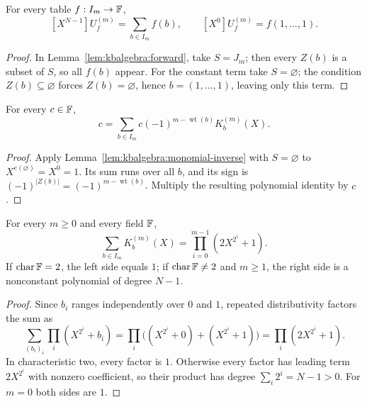 \begin{corollary}\label{cor:kbalgebra:extreme-coeffs}
For every table $f:I_m\to\mathbb{F}$,
\[
 [X^{N-1}]U_f^{(m)}=\sum_{b\in I_m}f(b),\qquad
 [X^0]U_f^{(m)}=f(1,\ldots,1).
\]
\end{corollary}
\begin{proof}
In Lemma~\ref{lem:kbalgebra:forward}, take $S=J_m$; then every $Z(b)$ is a subset of $S$, so all $f(b)$ appear. For the constant term take $S=\varnothing$; the condition $Z(b)\subseteq\varnothing$ forces $Z(b)=\varnothing$, hence $b=(1,\ldots,1)$, leaving only this term.
\end{proof}

\begin{proposition}\label{prop:kbalgebra:constant}
For every $c\in\mathbb{F}$,
\begin{equation}\label{eq:kbalgebra:constant}
 \boxed{c=\sum_{b\in I_m}c(-1)^{m-\operatorname{wt}(b)}K_b^{(m)}(X).}
\end{equation}
\end{proposition}
\begin{proof}
Apply Lemma~\ref{lem:kbalgebra:monomial-inverse} with $S=\varnothing$ to $X^{e(\varnothing)}=X^0=1$. Its sum runs over all $b$, and its sign is $(-1)^{|Z(b)|}=(-1)^{m-\operatorname{wt}(b)}$. Multiply the resulting polynomial identity by $c$.
\end{proof}

\begin{proposition}\label{prop:kbalgebra:partition}
For every $m\geq0$ and every field $\mathbb{F}$,
\begin{equation}\label{eq:kbalgebra:partition}
 \boxed{\sum_{b\in I_m}K_b^{(m)}(X)=\prod_{i=0}^{m-1}(2X^{2^i}+1).}
\end{equation}
If $\operatorname{char}\mathbb{F}=2$, the left side equals $1$; if $\operatorname{char}\mathbb{F}\neq2$ and $m\geq1$, the right side is a nonconstant polynomial of degree $N-1$.
\end{proposition}
\begin{proof}
Since $b_i$ ranges independently over $0$ and $1$, repeated distributivity factors the sum as
\[
 \sum_{(b_i)_i}\prod_i(X^{2^i}+b_i)
 =\prod_i\bigl((X^{2^i}+0)+(X^{2^i}+1)\bigr)
 =\prod_i(2X^{2^i}+1).
\]
In characteristic two, every factor is $1$. Otherwise every factor has leading term $2X^{2^i}$ with nonzero coefficient, so their product has degree $\sum_i2^i=N-1>0$. For $m=0$ both sides are $1$.
\end{proof}
